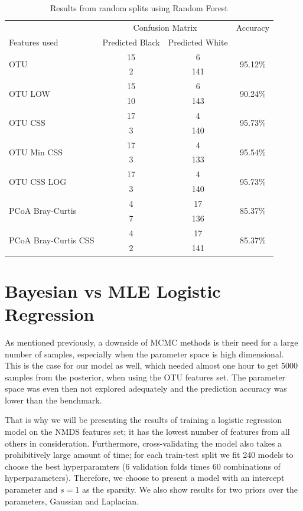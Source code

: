\begin{table}[!htb]
	\centering
	\caption{Results from random splits using Random Forest}
	\label{table:rfrrandom}
	\begin{tabular}{l c  c c}
		\toprule
		&\multicolumn{2}{c}{Confusion Matrix} & Accuracy\\
		Features used & Predicted Black&Predicted White&\\
		\midrule
		\multirow{2}{*}{OTU} &15 &6&\multirow{2}{*}{95.12\%}\\
		&	2&141&\\
		\cmidrule{2-3}
		\multirow{2}{*}{OTU LOW} &15 &6&\multirow{2}{*}{90.24\%}\\
		&	10&143&\\
		\cmidrule{2-3}
		\multirow{2}{*}{OTU CSS}&17 &4&\multirow{2}{*}{95.73\%}\\
		&	 3&140&\\
		\cmidrule{2-3}
		\multirow{2}{*}{OTU Min CSS}&17 &4&\multirow{2}{*}{95.54\%}\\
		&	 3&133&\\
		\cmidrule{2-3}
		\multirow{2}{*}{OTU CSS LOG}&17 &4&\multirow{2}{*}{95.73\%}\\
		&	 3&140&\\
		\cmidrule{2-3}
		\multirow{2}{*}{PCoA Bray-Curtis} &4 &17&\multirow{2}{*}{85.37\%}\\
		&	 7&136&\\
		\cmidrule{2-3}
		\multirow{2}{*}{PCoA Bray-Curtis CSS} &4 &17&\multirow{2}{*}{85.37\%}\\
		&	 2&141&\\
		\bottomrule
	\end{tabular}
	
\end{table}

\section{Bayesian vs MLE Logistic Regression}
As mentioned previously, a downside of MCMC methods is their need for a large number of samples, especially when the parameter space is high dimensional. This is the case for our model as well, which needed almost one hour to get 5000 samples from the posterior, when using the OTU features set. The parameter space was even then not explored adequately and the prediction accuracy was lower than the benchmark. 


That is why we will be presenting the results of training a logistic regression model on the NMDS features set; it has the lowest number of features from all others in consideration. Furthermore, cross-validating the model also takes a prohibitively large amount of time; for each train-test split we fit 240 models to choose the best hyperparamters (6 validation folds times 60 combinations of hyperparameters). Therefore, we choose to present a model with an intercept parameter and $s=1$ as the sparsity. We also show results for two priors over the parameters, Gaussian and Laplacian.

